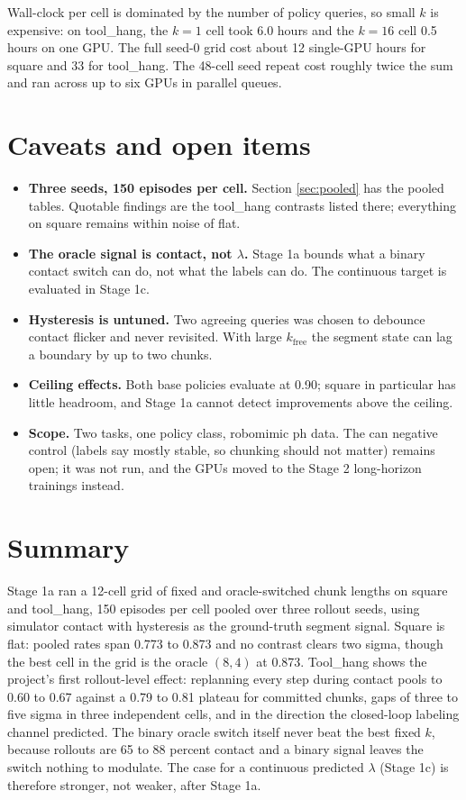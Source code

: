 \documentclass[11pt]{article}
\begin{document}
Wall-clock per cell is dominated by the number of policy queries, so small $k$ is
expensive: on tool\_hang, the $k{=}1$ cell took 6.0 hours and the $k{=}16$ cell 0.5
hours on one GPU. The full seed-0 grid cost about 12 single-GPU hours for square
and 33 for tool\_hang. The 48-cell seed repeat cost roughly twice the sum and ran
across up to six GPUs in parallel queues.

\section{Caveats and open items}

\begin{itemize}[leftmargin=1.4em]
\item \textbf{Three seeds, 150 episodes per cell.} Section \ref{sec:pooled} has
the pooled tables. Quotable findings are the tool\_hang contrasts listed there;
everything on square remains within noise of flat.
\item \textbf{The oracle signal is contact, not $\lambda$.} Stage 1a bounds what a
binary contact switch can do, not what the labels can do. The continuous target is
evaluated in Stage 1c.
\item \textbf{Hysteresis is untuned.} Two agreeing queries was chosen to debounce
contact flicker and never revisited. With large $k_{\mathrm{free}}$ the segment
state can lag a boundary by up to two chunks.
\item \textbf{Ceiling effects.} Both base policies evaluate at 0.90; square in
particular has little headroom, and Stage 1a cannot detect improvements above the
ceiling.
\item \textbf{Scope.} Two tasks, one policy class, robomimic ph data. The can
negative control (labels say mostly stable, so chunking should not matter)
remains open; it was not run, and the GPUs moved to the Stage 2 long-horizon
trainings instead.
\end{itemize}

\section{Summary}

Stage 1a ran a 12-cell grid of fixed and oracle-switched chunk lengths on square
and tool\_hang, 150 episodes per cell pooled over three rollout seeds, using
simulator contact with hysteresis as the ground-truth segment signal. Square is
flat: pooled rates span 0.773 to 0.873 and no contrast clears two sigma, though
the best cell in the grid is the oracle $(8,4)$ at 0.873. Tool\_hang shows the
project's first rollout-level effect: replanning every step during contact pools
to 0.60 to 0.67 against a 0.79 to 0.81 plateau for committed chunks, gaps of three
to five sigma in three independent cells, and in the direction the closed-loop
labeling channel predicted. The binary oracle switch itself never beat the best
fixed $k$, because rollouts are 65 to 88 percent contact and a binary signal
leaves the switch nothing to modulate. The case for a continuous predicted
$\lambda$ (Stage 1c) is therefore stronger, not weaker, after Stage 1a.
\end{document}
